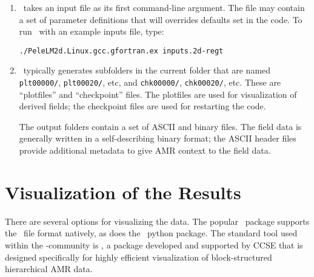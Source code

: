 \begin{enumerate}

\item \pelelm\ takes an input file as its first command-line argument.  The file may
contain a set of parameter definitions that will overrides defaults set in the code.
  To run \pelelm\ with an example inputs file, type:
\begin{verbatim}
./PeleLM2d.Linux.gcc.gfortran.ex inputs.2d-regt
\end{verbatim}

\item \pelelm\ typically generates subfolders in the current folder that
  are named {\tt plt00000/}, {\tt plt00020/}, etc, and {\tt chk00000/},
  {\tt chk00020/}, etc. These are ``plotfiles'' and ``checkpoint''
  files. The plotfiles are used for visualization of derived fields; the checkpoint
  files are used for restarting the code.

  The output folders contain a set of ASCII and binary files.  The field
  data is generally written in a self-describing binary format; the 
  ASCII header files provide additional metadata to give AMR context to the field data.

\end{enumerate}

\section{Visualization of the Results}

There are several options for visualizing the data.  The popular
\visit\ package supports the \amrex\ file format natively, as does
the \yt\ python package.  The standard tool used within the
\amrex-community is \amrvis, a package developed and supported 
by CCSE that is designed specifically for highly efficient visualization
of block-structured hierarchical AMR data.

